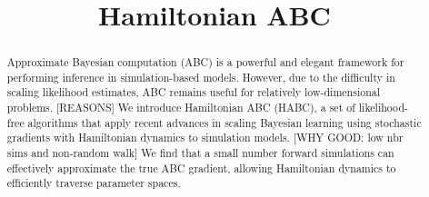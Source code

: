 \documentclass[]{article}
\date{}
\title{Hamiltonian ABC}
\author{} %
\begin{document}
 
	\vskip -0.3in
  
\maketitle

% 
% 
% 
\begin{abstract} 
  Approximate Bayesian computation (ABC) is a powerful and elegant framework for performing inference in simulation-based models.  However, due to the difficulty in scaling likelihood estimates, ABC remains useful for relatively low-dimensional problems.  [REASONS] We introduce Hamiltonian ABC (HABC), a set of likelihood-free algorithms that apply recent advances in scaling Bayesian learning using stochastic gradients with Hamiltonian dynamics to simulation models.   [WHY GOOD: low nbr sims and non-random walk]  We find that a small number forward simulations can effectively approximate the true ABC gradient, allowing Hamiltonian dynamics to efficiently traverse parameter spaces.
  

\end{abstract}
\end{document}
